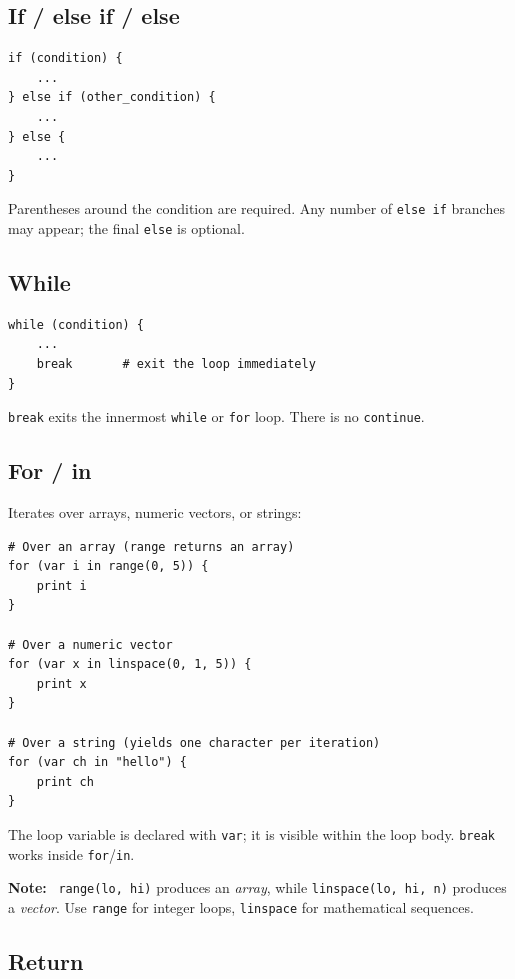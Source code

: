 \documentclass[11pt,a4paper]{article}
\newcommand{\musil}[1]{\lstinline[style=musilinline]{#1}}
\newenvironment{note}{\begin{mdframed}[backgroundcolor=blue!6,linecolor=musilblue,linewidth=0.8pt]\textbf{Note:}\ }{\end{mdframed}}
\begin{document}
\subsection{If / else if / else}

\begin{lstlisting}
if (condition) {
    ...
} else if (other_condition) {
    ...
} else {
    ...
}
\end{lstlisting}

Parentheses around the condition are required. Any number of \musil{else if}
branches may appear; the final \musil{else} is optional.

\subsection{While}

\begin{lstlisting}
while (condition) {
    ...
    break       # exit the loop immediately
}
\end{lstlisting}

\musil{break} exits the innermost \musil{while} or \musil{for} loop. There is no
\musil{continue}.

\subsection{For / in}

Iterates over arrays, numeric vectors, or strings:

\begin{lstlisting}
# Over an array (range returns an array)
for (var i in range(0, 5)) {
    print i
}

# Over a numeric vector
for (var x in linspace(0, 1, 5)) {
    print x
}

# Over a string (yields one character per iteration)
for (var ch in "hello") {
    print ch
}
\end{lstlisting}

The loop variable is declared with \musil{var}; it is visible within the loop
body. \musil{break} works inside \musil{for}/\musil{in}.

\begin{note}
\musil{range(lo, hi)} produces an \emph{array}, while \musil{linspace(lo, hi, n)}
produces a \emph{vector}. Use \musil{range} for integer loops, \musil{linspace}
for mathematical sequences.
\end{note}

\subsection{Return}
\end{document}
